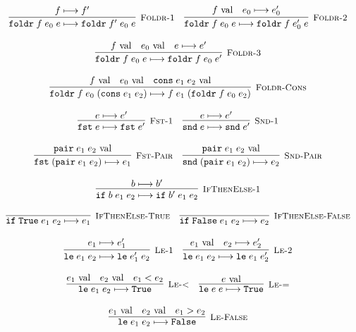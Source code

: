 \documentclass[10pt]{article}
\begin{document}
\[\begin{array}{cc}
    \\\\
    \labinfer[Foldr-1]{\foldr\; f\; e_0\; e \reduces \foldr\; f'\; e_0\; e}{f \reduces f'}
    ~~~
    \labinfer[Foldr-2]{\foldr\; f\; e_0\; e \reduces \foldr\; f\; e_0'\; e}{f \val & e_0 \reduces e_0'}
    \\\\
    \labinfer[Foldr-3]{\foldr\; f\; e_0\; e \reduces \foldr\; f\; e_0\; e'}{f \val & e_0 \val & e \reduces e'}
    \\\\
    \labinfer[Foldr-Cons]{\foldr\; f\; e_0\; (\cons\; e_1\; e_2) \reduces f\; e_1\; (\foldr\; f\; e_0\; e_2)}{f \val & e_0 \val & \cons\; e_1\; e_2 \val}
    \\\\
    \labinfer[Fst-1]{\fst\; e \reduces \fst\; e'}{e \reduces e'}
    ~~~
    \labinfer[Snd-1]{\snd\; e \reduces \snd\; e'}{e \reduces e'}
    \\\\
    \labinfer[Fst-Pair]{\fst\; (\pair\; e_1\; e_2) \reduces e_1}{\pair\; e_1\; e_2 \val}
    ~~~
    \labinfer[Snd-Pair]{\snd\; (\pair\; e_1\; e_2) \reduces e_2}{\pair\; e_1\; e_2 \val}
    \\\\
    \labinfer[IfThenElse-1]{\ite\; b\; e_1\; e_2 \reduces \ite\; b'\; e_1\; e_2}{b \reduces b'}
    \\\\
    \labinfer[IfThenElse-True]{\ite\; \True\; e_1\; e_2 \reduces e_1}{}
    ~~~
    \labinfer[IfThenElse-False]{\ite\; \False\; e_1\; e_2 \reduces e_2}{}
    \\\\
    \labinfer[Le-1]{\lesseq\; e_1\; e_2 \reduces \lesseq\; e_1'\; e_2}{e_1 \reduces e_1'}
    ~~~
    \labinfer[Le-2]{\lesseq\; e_1\; e_2 \reduces \lesseq\; e_1\; e_2'}{e_1 \val & e_2 \reduces e_2'}
    \\\\
    \labinfer[Le-<]{\lesseq\; e_1\; e_2 \reduces \True}{e_1 \val & e_2 \val & e_1 < e_2}
    ~~~
    \labinfer[Le-=]{\lesseq\; e\; e \reduces \True}{e \val}
    \\\\
    \labinfer[Le-False]{\lesseq\; e_1\; e_2 \reduces \False}{e_1 \val & e_2 \val & e_1 > e_2}
    \\\\

\end{array}\]
\end{document}
